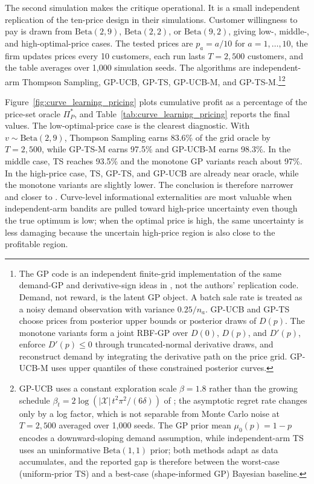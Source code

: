 The second simulation makes the \citet{Weaver2025} critique operational. It is a small independent replication of the ten-price design in their simulations. Customer willingness to pay is drawn from $\mathrm{Beta}(2,9)$, $\mathrm{Beta}(2,2)$, or $\mathrm{Beta}(9,2)$, giving low-, middle-, and high-optimal-price cases. The tested prices are $p_a=a/10$ for $a=1,\ldots,10$, the firm updates prices every 10 customers, each run lasts $T=2{,}500$ customers, and the table averages over 1{,}000 simulation seeds. The algorithms are independent-arm Thompson Sampling, GP-UCB, GP-TS, GP-UCB-M, and GP-TS-M.\footnote{The GP code is an independent finite-grid implementation of the same demand-GP and derivative-sign ideas in \citet{Weaver2025}, not the authors' replication code. Demand, not reward, is the latent GP object. A batch sale rate is treated as a noisy demand observation with variance $0.25/n_a$. GP-UCB and GP-TS choose prices from posterior upper bounds or posterior draws of $D(p)$. The monotone variants form a joint RBF-GP over $D(0)$, $D(p)$, and $D'(p)$, enforce $D'(p) \leq 0$ through truncated-normal derivative draws, and reconstruct demand by integrating the derivative path on the price grid. GP-UCB-M uses upper quantiles of these constrained posterior curves.}\footnote{GP-UCB uses a constant exploration scale $\beta = 1.8$ rather than the growing schedule $\beta_t = 2\log(|\mathcal{X}|\, t^2 \pi^2 / (6\delta))$ of \citet{Srinivas2010}; the asymptotic regret rate changes only by a log factor, which is not separable from Monte Carlo noise at $T = 2{,}500$ averaged over 1{,}000 seeds. The GP prior mean $\mu_0(p) = 1 - p$ encodes a downward-sloping demand assumption, while independent-arm TS uses an uninformative $\mathrm{Beta}(1,1)$ prior; both methods adapt as data accumulates, and the reported gap is therefore between the worst-case (uniform-prior TS) and a best-case (shape-informed GP) Bayesian baseline.}

Figure~\ref{fig:curve_learning_pricing} plots cumulative profit as a percentage of the price-set oracle $\Pi_P^*$, and Table~\ref{tab:curve_learning_pricing} reports the final values. The low-optimal-price case is the clearest diagnostic. With $v \sim \mathrm{Beta}(2,9)$, Thompson Sampling earns 83.6\% of the grid oracle by $T=2{,}500$, while GP-TS-M earns 97.5\% and GP-UCB-M earns 98.3\%. In the middle case, TS reaches 93.5\% and the monotone GP variants reach about 97\%. In the high-price case, TS, GP-TS, and GP-UCB are already near oracle, while the monotone variants are slightly lower. The conclusion is therefore narrower and closer to \citet{Weaver2025}. Curve-level informational externalities are most valuable when independent-arm bandits are pulled toward high-price uncertainty even though the true optimum is low; when the optimal price is high, the same uncertainty is less damaging because the uncertain high-price region is also close to the profitable region.

